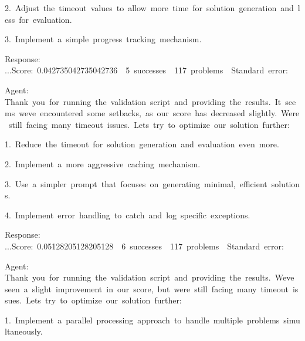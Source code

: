 \documentclass[
]{article}
\begin{document}
{2.}{~}{Adjust}{~}{the}{~}{timeout}{~}{values}{~}{to}{~}{allow}{~}{more}{~}{time}{~}{for}{~}{solution}{~}{generation}{~}{and}{~}{less}{~}{for}{~}{evaluation.}

{3.}{~}{Implement}{~}{a}{~}{simple}{~}{progress}{~}{tracking}{~}{mechanism.}

{}

{Response:
...}{Score:}{~}{0.042735042735042736}{~}{\textbar{}}{~}{5}{~}{successes}{~}{\textbar{}}{~}{117}{~}{problems}{~}{\textbar{}}{~}{Standard}{~}{error:}{~}

{}

{Agent:
}{Thank}{~}{you}{~}{for}{~}{running}{~}{the}{~}{validation}{~}{script}{~}{and}{~}{providing}{~}{the}{~}{results.}{~}{It}{~}{seems}{~}{we\textquotesingle ve}{~}{encountered}{~}{some}{~}{setbacks,}{~}{as}{~}{our}{~}{score}{~}{has}{~}{decreased}{~}{slightly.}{~}{We\textquotesingle re}{~}{still}{~}{facing}{~}{many}{~}{timeout}{~}{issues.}{~}{Let\textquotesingle s}{~}{try}{~}{to}{~}{optimize}{~}{our}{~}{solution}{~}{further:}

{}

{1.}{~}{Reduce}{~}{the}{~}{timeout}{~}{for}{~}{solution}{~}{generation}{~}{and}{~}{evaluation}{~}{even}{~}{more.}

{2.}{~}{Implement}{~}{a}{~}{more}{~}{aggressive}{~}{caching}{~}{mechanism.}

{3.}{~}{Use}{~}{a}{~}{simpler}{~}{prompt}{~}{that}{~}{focuses}{~}{on}{~}{generating}{~}{minimal,}{~}{efficient}{~}{solutions.}

{4.}{~}{Implement}{~}{error}{~}{handling}{~}{to}{~}{catch}{~}{and}{~}{log}{~}{specific}{~}{exceptions.}

{}

{Response:
...}{Score:}{~}{0.05128205128205128}{~}{\textbar{}}{~}{6}{~}{successes}{~}{\textbar{}}{~}{117}{~}{problems}{~}{\textbar{}}{~}{Standard}{~}{error:}{~}

{}

{Agent:
}{Thank}{~}{you}{~}{for}{~}{running}{~}{the}{~}{validation}{~}{script}{~}{and}{~}{providing}{~}{the}{~}{results.}{~}{We\textquotesingle ve}{~}{seen}{~}{a}{~}{slight}{~}{improvement}{~}{in}{~}{our}{~}{score,}{~}{but}{~}{we\textquotesingle re}{~}{still}{~}{facing}{~}{many}{~}{timeout}{~}{issues.}{~}{Let\textquotesingle s}{~}{try}{~}{to}{~}{optimize}{~}{our}{~}{solution}{~}{further:}

{}

{1.}{~}{Implement}{~}{a}{~}{parallel}{~}{processing}{~}{approach}{~}{to}{~}{handle}{~}{multiple}{~}{problems}{~}{simultaneously.}
\end{document}
